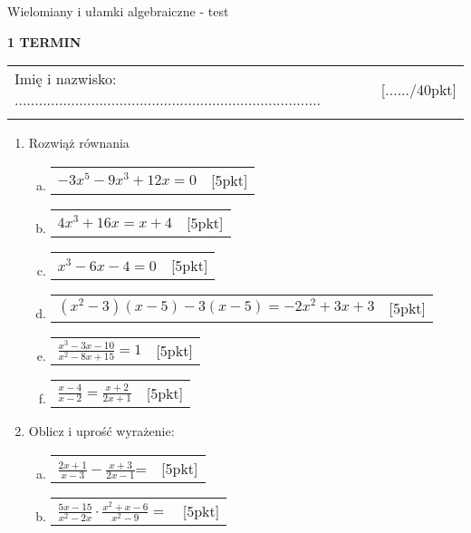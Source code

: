 \documentclass[12pt,a4paper]{article}
\begin{document}
	\begin{center}
		\LARGE Wielomiany i ułamki algebraiczne - test
	\end{center}
	\vspace{1.5cm}
	\begin{flushright}
		\textbf{1 TERMIN}
	\end{flushright}
	\begin{tabular}{p{13cm} r}
		Imię i nazwisko: ............................................................................
		&[....../40pkt]\\ 
		\vspace{0.5cm}
	\end{tabular}
	\begin{enumerate}[1.]	\large
		\item  Rozwiąż równania
		\begin{enumerate}[a)]
			\item \begin{tabular}{p{13cm} r}
				$-3x^5-9x^3+12x=0$ &[5pkt]\\ 
			\end{tabular}
			\item \begin{tabular}{p{13cm} r}
				$4x^3+16x=x+4$ &[5pkt]\\ 
			\end{tabular}
			\item  \begin{tabular}{p{13cm} r}
				$x^3-6x-4=0$&[5pkt]\\ 
			\end{tabular}
			\item  \begin{tabular}{p{13cm} r}
				$(x^2-3)(x-5)-3(x-5)=-2x^2+3x+3$&[5pkt]\\ 
			\end{tabular}
			\item  \begin{tabular}{p{13cm} r}
				$\frac{x^3-3x-10}{x^2-8x+15}=1$&[5pkt]\\ 
			\end{tabular}
			\item  \begin{tabular}{p{13cm} r}
				$\frac{x-4}{x-2}=\frac{x+2}{2x+1}$&[5pkt]\\ 
			\end{tabular}
		\end{enumerate}
		
		\item Oblicz i uprość wyrażenie:
		
		\begin{enumerate}[a)]
			\item  \begin{tabular}{p{13cm} r}
				$\frac{2x+1}{x-3}-\frac{x+3}{2x-1}$=	&[5pkt]\\ 
			\end{tabular}
			\item  \begin{tabular}{p{13cm} r}
				$\frac{5x-15}{x^2-2x}\cdot\frac{x^2+x-6}{x^2-9}=$&[5pkt]\\ 
			\end{tabular}
		\end{enumerate}
		
		
		
		
		
	\end{enumerate}
	
\end{document}
